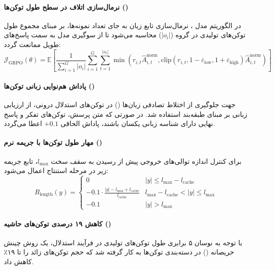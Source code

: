 \item {}

\paragraph*{نرمال‌سازی اتلاف در سطح طول توکن‌ها ()}
در الگوریتم  مدل  \cite{mistral2025magistral}، نرمال‌سازی تابع زیان به جای تعداد نمونه‌ها، بر مبنای مجموع طول توکن‌های تولیدی در گروه ($|o_i|$) محاسبه می‌شود تا از سوگیری مدل به سمت پاسخ‌های طویل ممانعت گردد:
\begin{equation}
    \mathcal{J}_{\text{GRPO}}(\theta) = \mathbb{E} \left[ \frac{1}{\sum_{i=1}^G |o_i|} \sum_{i=1}^G \sum_{t=1}^{|o_i|} \min \left( r_{i,t} \hat{A}_{i,t}^{\text{norm}}, \text{clip}(r_{i,t}, 1-\varepsilon_{\text{low}}, 1+\varepsilon_{\text{high}}) \hat{A}_{i,t}^{\text{norm}} \right) \right]
\end{equation}

\paragraph*{پاداش هم‌نوایی زبانی توکن‌ها ()}
جهت جلوگیری از اختلاط تصادفی زبان‌ها () در توکن‌های استدلال درونی، از ارزیابی زبانی بر مبنای طبقه‌بند  استفاده شد. در صورتی که متن پرسش، توکن‌های تفکر و پاسخ نهایی دارای شناسه زبانی یکسان باشند، پاداش الحاقی $+0.1$ اعطا می‌گردد.

\paragraph*{مهار طول توکن‌ها با جریمه نرم ()}
برای کنترل اندازه توالی‌های خروجی پیش از رسیدن به سقف سخت $l_{\max}$، تابع جریمه زیر در مرحله استنتاج اعمال می‌شود:
\begin{equation}
    R_{\text{length}}(y) = \begin{cases} 
        0 & |y| \le l_{\max} - l_{\text{cache}} \\
        -0.1 \cdot \frac{|y| - l_{\max} + l_{\text{cache}}}{l_{\text{cache}}} & l_{\max} - l_{\text{cache}} < |y| \le l_{\max} \\
        -0.1 & |y| > l_{\max}
    \end{cases}
\end{equation}

\paragraph*{کاهش ۱۹ درصدی توکن‌های حاشیه ()}
با توجه به نوسان ۵ برابری طول توکن‌های تولیدی در فرآیند استدلال، یک روش چینش حریصانه () در دسته‌بندی توکن‌ها به کار گرفته شد که حجم توکن‌های زائد  را تا ۱۹٪ کاهش داد.